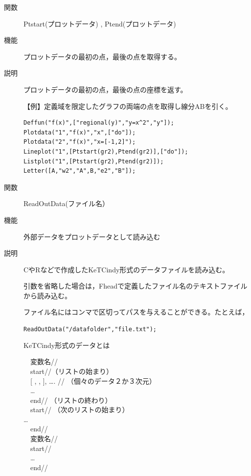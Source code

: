 \documentclass[papersize,a4paper,12pt,uplatex]{jsarticle}
\begin{document}
\begin{description}

\vspace{\baselineskip}
\hypertarget{ptstart}{}
\item[関数]Ptstart(プロットデータ) , Ptend(プロットデータ)
\item[機能]プロットデータの最初の点，最後の点を取得する。
\item[説明]プロットデータの最初の点，最後の点の座標を返す。

\vspace{\baselineskip}
【例】定義域を限定したグラフの両端の点を取得し線分ABを引く。
\begin{verbatim}
Deffun("f(x)",["regional(y)","y=x^2","y"]); 
Plotdata("1","f(x)","x",["do"]);
Plotdata("2","f(x)","x=[-1,2]");
Lineplot("1",[Ptstart(gr2),Ptend(gr2)],["do"]);
Listplot("1",[Ptstart(gr2),Ptend(gr2)]);
Letter([A,"w2","A",B,"e2","B"]);
\end{verbatim}
\vspace{\baselineskip}
\begin{center}  \end{center}

\vspace{\baselineskip}
\hypertarget{readoutdata}{}
\item[関数]ReadOutData(ファイル名）
\item[機能]外部データをプロットデータとして読み込む
\item[説明]CやRなどで作成したKeTCindy形式のデータファイルを読み込む。

引数を省略した場合は，Fheadで定義したファイル名のテキストファイルから読み込む。

ファイル名にはコンマで区切ってパスを与えることができる。たとえば，

\verb|ReadOutData("/datafolder","file.txt"); |

KeTCindy形式のデータとは

　変数名// \\
　start//（リストの始まり） \\
　[ , , ], …. // （個々のデータ２か３次元） \\
　… \\
　end// （リストの終わり） \\
　start// （次のリストの始まり） \\
… \\
　end// \\
　変数名// \\
　start// \\
　… \\
　end// \\


\end{description}
\end{document}
